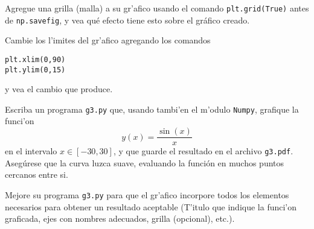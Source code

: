 \documentclass[11pt]{exam}
\begin{document}
\begin{questions}
\item Agregue una grilla (malla) a su gr'afico usando el comando \texttt{plt.grid(True)} antes de \texttt{np.savefig}, y vea qué efecto tiene esto sobre el gráfico creado.
\item Cambie los l'imites del gr'afico agregando los comandos

\begin{verbatim}
plt.xlim(0,90)
plt.ylim(0,15)
\end{verbatim}

y vea el cambio que produce.

\item Escriba un programa \texttt{g3.py} que, usando tambi'en el m'odulo \texttt{Numpy}, grafique la funci'on 
\begin{equation}
y(x)=\frac{\sin(x)}{x}
\end{equation}
en el intervalo $x\in[-30,30]$, y que guarde el resultado en el archivo \texttt{g3.pdf}. Asegúrese que la curva luzca suave, evaluando la función en muchos puntos cercanos entre si.

\item Mejore su programa \texttt{g3.py} para que el gr'afico incorpore todos los elementos necesarios para obtener un resultado aceptable (T'itulo que indique la funci'on graficada, ejes con nombres adecuados, grilla (opcional), etc.).


\end{questions}
\end{document}
